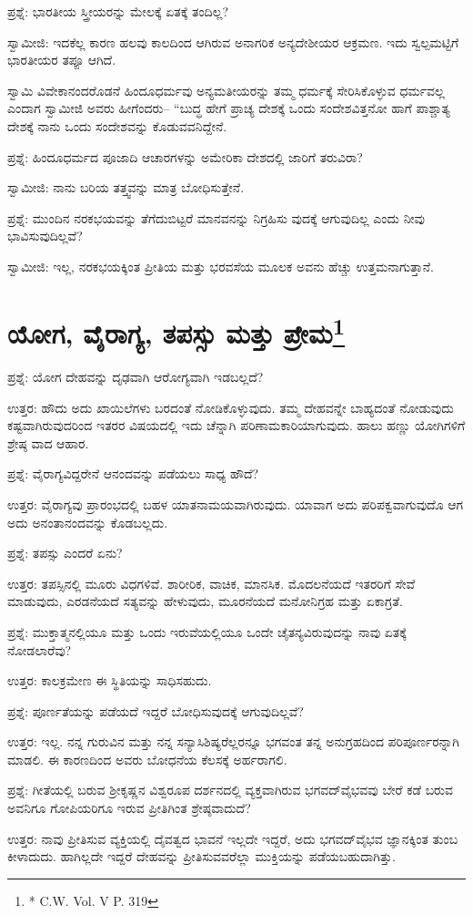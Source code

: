 ಪ್ರಶ್ನೆ: ಭಾರತೀಯ ಸ್ತ್ರೀಯರನ್ನು ಮೇಲಕ್ಕೆ ಏತಕ್ಕೆ ತಂದಿಲ್ಲ?

ಸ್ವಾಮೀಜಿ: ಇದಕೆಲ್ಲ ಕಾರಣ ಹಲವು ಕಾಲದಿಂದ ಆಗಿರುವ ಅನಾಗರಿಕ ಅನ್ಯದೇಶೀಯರ ಆಕ್ರಮಣ. ಇದು ಸ್ವಲ್ಪಮಟ್ಟಿಗೆ ಭಾರತೀಯರ ತಪ್ಪೂ ಆಗಿದೆ.

ಸ್ವಾಮಿ ವಿವೇಕಾನಂದರೊಡನೆ ಹಿಂದೂಧರ್ಮವು ಅನ್ಯಮತೀಯರನ್ನು ತಮ್ಮ ಧರ್ಮಕ್ಕೆ ಸೇರಿಸಿಕೊಳ್ಳುವ ಧರ್ಮವಲ್ಲ ಎಂದಾಗ ಸ್ವಾಮೀಜಿ ಅವರು ಹೀಗೆಂದರು– “ಬುದ್ಧ ಹೇಗೆ ಪ್ರಾಚ್ಯ ದೇಶಕ್ಕೆ ಒಂದು ಸಂದೇಶವಿತ್ತನೋ ಹಾಗೆ ಪಾಶ್ಚಾತ್ಯ ದೇಶಕ್ಕೆ ನಾನು ಒಂದು ಸಂದೇಶವನ್ನು ಕೊಡುವವನಿದ್ದೇನೆ.

ಪ್ರಶ್ನೆ: ಹಿಂದೂಧರ್ಮದ ಪೂಜಾದಿ ಆಚಾರಗಳನ್ನು ಅಮೇರಿಕಾ ದೇಶದಲ್ಲಿ ಜಾರಿಗೆ ತರುವಿರಾ?

ಸ್ವಾಮೀಜಿ: ನಾನು ಬರಿಯ ತತ್ತ್ವವನ್ನು ಮಾತ್ರ ಬೋಧಿಸುತ್ತೇನೆ.

ಪ್ರಶ್ನೆ: ಮುಂದಿನ ನರಕಭಯವನ್ನು ತೆಗೆದುಬಿಟ್ಟರೆ ಮಾನವನನ್ನು ನಿಗ್ರಹಿಸು ವುದಕ್ಕೆ ಆಗುವುದಿಲ್ಲ ಎಂದು ನೀವು ಭಾವಿಸುವುದಿಲ್ಲವೆ?

ಸ್ವಾಮೀಜಿ: ಇಲ್ಲ, ನರಕಭಯಕ್ಕಿಂತ ಪ್ರೀತಿಯ ಮತ್ತು ಭರವಸೆಯ ಮೂಲಕ ಅವನು ಹೆಚ್ಚು ಉತ್ತಮನಾಗುತ್ತಾನೆ.


\section[ಯೋಗ, ವೈರಾಗ್ಯ, ತಪಸ್ಸು ಮತ್ತು ಪ್ರೇಮ]{ಯೋಗ, ವೈರಾಗ್ಯ, ತಪಸ್ಸು ಮತ್ತು ಪ್ರೇಮ\protect\footnote{* C.W. Vol. V P. 319}}

ಪ್ರಶ್ನೆ: ಯೋಗ ದೇಹವನ್ನು ದೃಢವಾಗಿ ಆರೋಗ್ಯವಾಗಿ ಇಡಬಲ್ಲದೆ?

ಉತ್ತರ: ಹೌದು ಅದು ಖಾಯಿಲೆಗಳು ಬರದಂತೆ ನೋಡಿಕೊಳ್ಳುವುದು. ತಮ್ಮ ದೇಹವನ್ನೇ ಬಾಹ್ಯದಂತೆ ನೋಡುವುದು ಕಷ್ಟವಾಗಿರುವುದರಿಂದ ಇತರರ ವಿಷಯದಲ್ಲಿ ಇದು ಚೆನ್ನಾಗಿ ಪರಿಣಾಮಕಾರಿಯಾಗುವುದು. ಹಾಲು ಹಣ್ಣು ಯೋಗಿಗಳಿಗೆ ಶ್ರೇಷ್ಠ ವಾದ ಆಹಾರ.

ಪ್ರಶ್ನೆ: ವೈರಾಗ್ಯವಿದ್ದರೇನೆ ಆನಂದವನ್ನು ಪಡೆಯಲು ಸಾಧ್ಯ ಹೌದೆ?

ಉತ್ತರ: ವೈರಾಗ್ಯವು ಪ್ರಾರಂಭದಲ್ಲಿ ಬಹಳ ಯಾತನಾಮಯವಾಗಿರುವುದು. ಯಾವಾಗ ಅದು ಪರಿಪಕ್ವವಾಗುವುದೊ ಆಗ ಅದು ಅನಂತಾನಂದವನ್ನು ಕೊಡಬಲ್ಲದು.

ಪ್ರಶ್ನೆ: ತಪಸ್ಸು ಎಂದರೆ ಏನು?

ಉತ್ತರ: ತಪಸ್ಸಿನಲ್ಲಿ ಮೂರು ವಿಧಗಳಿವೆ. ಶಾರೀರಿಕ, ವಾಚಿಕ, ಮಾನಸಿಕ. ಮೊದಲನೆಯದೆ ಇತರರಿಗೆ ಸೇವೆ ಮಾಡುವುದು, ಎರಡನೆಯದೆ ಸತ್ಯವನ್ನು ಹೇಳುವುದು, ಮೂರನೆಯದೆ ಮನೋನಿಗ್ರಹ ಮತ್ತು ಏಕಾಗ್ರತೆ.

ಪ್ರಶ್ನೆ: ಮುಕ್ತಾತ್ಮನಲ್ಲಿಯೂ ಮತ್ತು ಒಂದು ಇರುವೆಯಲ್ಲಿಯೂ ಒಂದೇ ಚೈತನ್ಯವಿರುವುದನ್ನು ನಾವು ಏತಕ್ಕೆ ನೋಡಲಾರೆವು?

ಉತ್ತರ: ಕಾಲಕ್ರಮೇಣ ಈ ಸ್ಥಿತಿಯನ್ನು ಸಾಧಿಸಹುದು.

ಪ್ರಶ್ನೆ: ಪೂರ್ಣತೆಯನ್ನು ಪಡೆಯದೆ ಇದ್ದರೆ ಬೋಧಿಸುವುದಕ್ಕೆ ಆಗುವುದಿಲ್ಲವೆ?

ಉತ್ತರ: ಇಲ್ಲ. ನನ್ನ ಗುರುವಿನ ಮತ್ತು ನನ್ನ ಸನ್ಯಾಸಿಶಿಷ್ಯರೆಲ್ಲರನ್ನೂ ಭಗವಂತ ತನ್ನ ಅನುಗ್ರಹದಿಂದ ಪರಿಪೂರ್ಣರನ್ನಾಗಿ ಮಾಡಲಿ. ಈ ಕಾರಣದಿಂದ ಅವರು ಬೋಧನೆಯ ಕೆಲಸಕ್ಕೆ ಅರ್ಹರಾಗಲಿ.

ಪ್ರಶ್ನೆ: ಗೀತೆಯಲ್ಲಿ ಬರುವ ಶ‍್ರೀಕೃಷ್ಣನ ವಿಶ್ವರೂಪ ದರ್ಶನದಲ್ಲಿ ವ್ಯಕ್ತವಾಗಿರುವ ಭಗವದ್​ವೈಭವವು ಬೇರೆ ಕಡೆ ಬರುವ ಅವನಿಗೂ ಗೋಪಿಯರಿಗೂ ಇರುವ ಪ್ರೀತಿಗಿಂತ ಶ್ರೇಷ್ಠವಾದುದೆ?

ಉತ್ತರ: ನಾವು ಪ್ರೀತಿಸುವ ವ್ಯಕ್ತಿಯಲ್ಲಿ ದೈವತ್ವದ ಭಾವನೆ ಇಲ್ಲದೇ ಇದ್ದರೆ, ಅದು ಭಗವದ್​ವೈಭವ ಜ್ಞಾನಕ್ಕಿಂತ ತುಂಬ ಕೀಳಾದುದು. ಹಾಗಿಲ್ಲದೇ ಇದ್ದರೆ ದೇಹವನ್ನು ಪ್ರೀತಿಸುವವರೆಲ್ಲಾ ಮುಕ್ತಿಯನ್ನು ಪಡೆಯಬಹುದಾಗಿತ್ತು.

